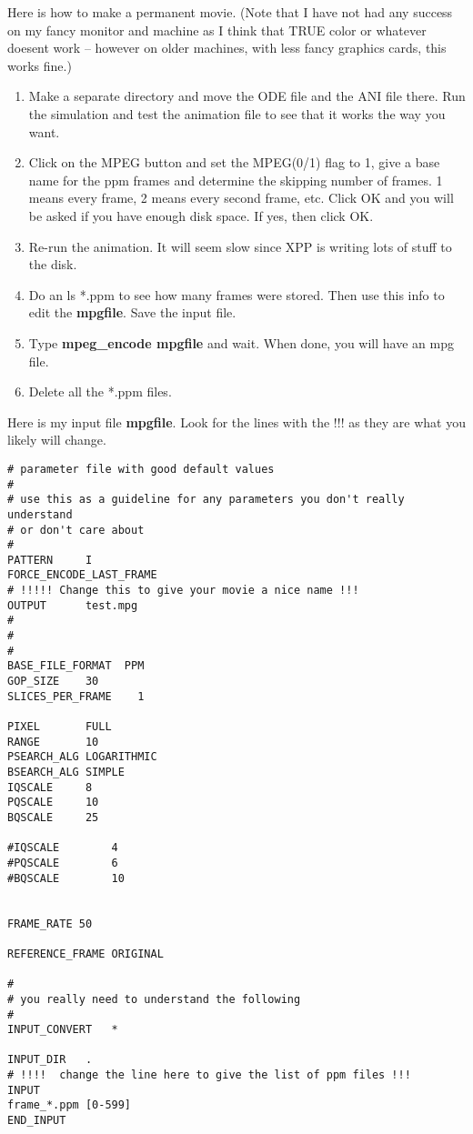 \documentclass{article}
\begin{document}
Here is how to make a permanent movie. (Note that I have not had any
success on my fancy monitor and machine as I think that TRUE color or
whatever doesent work -- however on older machines, with less fancy
graphics cards, this works fine.)

\begin{enumerate}
\item Make a separate directory and move the ODE file and the ANI file
there. Run the simulation and test the animation file to see that it
works the way you want.
\item Click on the MPEG button and set the MPEG(0/1) flag to 1, give a
base name for the ppm frames and determine the skipping number of
frames. 1 means every frame, 2 means every second frame, etc.  Click
OK and you will be asked if you have enough disk space. If yes, then
click OK.
\item Re-run the animation. It will seem slow since XPP is writing
lots of stuff to the disk.
\item Do an ls *.ppm  to see how many frames were stored. Then use
this info to edit the {\bf mpgfile}. Save the input file.
\item Type {\bf mpeg\_encode mpgfile} and wait. When done, you will
have an mpg file.
\item Delete all the *.ppm files.
\end{enumerate}

Here is my input file {\bf mpgfile}. Look for the lines with the !!!
as they are what you likely will change.

\begin{verbatim}
# parameter file with good default values
#
# use this as a guideline for any parameters you don't really understand
# or don't care about
#
PATTERN		I
FORCE_ENCODE_LAST_FRAME
# !!!!! Change this to give your movie a nice name !!!
OUTPUT		test.mpg
#
#
#
BASE_FILE_FORMAT  PPM
GOP_SIZE	30
SLICES_PER_FRAME	1

PIXEL		FULL
RANGE		10
PSEARCH_ALG	LOGARITHMIC
BSEARCH_ALG	SIMPLE
IQSCALE		8
PQSCALE		10
BQSCALE		25

#IQSCALE		4
#PQSCALE		6
#BQSCALE		10


FRAME_RATE 50

REFERENCE_FRAME	ORIGINAL

#
# you really need to understand the following
#
INPUT_CONVERT	*

INPUT_DIR	.
# !!!!  change the line here to give the list of ppm files !!!
INPUT
frame_*.ppm [0-599]
END_INPUT
\end{verbatim}
\end{document}

